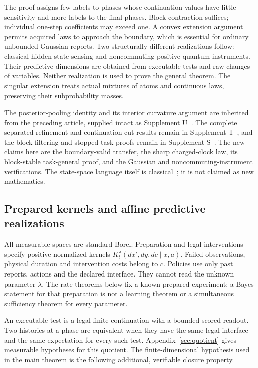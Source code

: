 The proof assigns few labels to phases whose continuation values have little sensitivity and more labels to the final phases. Block contraction suffices; individual one-step coefficients may exceed one. A convex extension argument permits acquired laws to approach the boundary, which is essential for ordinary unbounded Gaussian reports. Two structurally different realizations follow: classical hidden-state sensing and noncommuting positive quantum instruments. Their predictive dimensions are obtained from executable tests and raw changes of variables. Neither realization is used to prove the general theorem. The singular extension treats actual mixtures of atoms and continuous laws, preserving their subprobability masses.

The posterior-pooling identity and its interior curvature argument are inherited from the preceding article, supplied intact as Supplement U~\cite{pooling}. The complete separated-refinement and continuation-cut results remain in Supplement T~\cite{retained}, and the block-filtering and stopped-task proofs remain in Supplement S~\cite{companion}. The new claims here are the boundary-valid transfer, the sharp charged-clock law, its block-stable task-general proof, and the Gaussian and noncommuting-instrument verifications. The state-space language itself is classical~\cite{davies,blackwell}; it is not claimed as new mathematics.

\subsection{Prepared kernels and affine predictive realizations}
All measurable spaces are standard Borel. Preparation and legal interventions specify positive normalized kernels $K_t^\lambda(dx',dy,dc\mid x,a)$. Failed observations, physical duration and intervention costs belong to $c$. Policies use only past reports, actions and the declared interface. They cannot read the unknown parameter $\lambda$. The rate theorems below fix a known prepared experiment; a Bayes statement for that preparation is not a learning theorem or a simultaneous sufficiency theorem for every parameter.

An executable test is a legal finite continuation with a bounded scored readout. Two histories at a phase are equivalent when they have the same legal interface and the same expectation for every such test. Appendix~\ref{sec:quotient} gives measurable hypotheses for this quotient. The finite-dimensional hypothesis used in the main theorem is the following additional, verifiable closure property.

